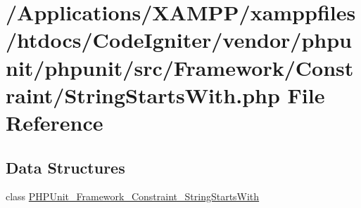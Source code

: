 \hypertarget{_string_starts_with_8php}{}\section{/\+Applications/\+X\+A\+M\+P\+P/xamppfiles/htdocs/\+Code\+Igniter/vendor/phpunit/phpunit/src/\+Framework/\+Constraint/\+String\+Starts\+With.php File Reference}
\label{_string_starts_with_8php}
\subsection*{Data Structures}
\begin{DoxyCompactItemize}
\item 
class \mbox{\hyperlink{class_p_h_p_unit___framework___constraint___string_starts_with}{P\+H\+P\+Unit\+\_\+\+Framework\+\_\+\+Constraint\+\_\+\+String\+Starts\+With}}
\end{DoxyCompactItemize}

